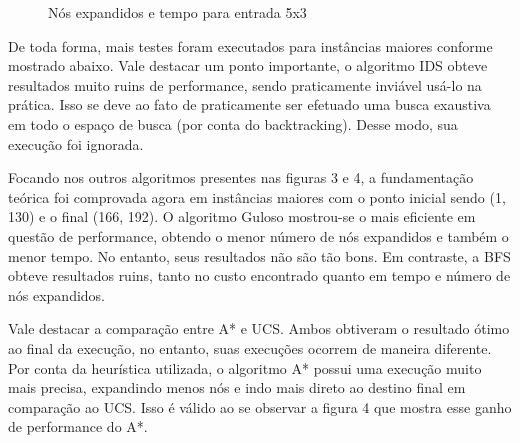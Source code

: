 \documentclass[10pt]{extarticle} %
\begin{document}
\begin{figure}[H]
\begin{minipage}{0.5\linewidth}
        \caption{Nós expandidos e tempo para entrada 5x3}
        \label{fig:expanded-nodes-vs-time}
    \end{minipage}
\end{figure}

De toda forma, mais testes foram executados para instâncias maiores conforme mostrado abaixo. Vale destacar um ponto importante, o algoritmo IDS obteve resultados muito ruins de performance, sendo praticamente inviável usá-lo na prática. Isso se deve ao fato de praticamente ser efetuado uma busca exaustiva em todo o espaço de busca (por conta do backtracking). Desse modo, sua execução foi ignorada.

Focando nos outros algoritmos presentes nas figuras 3 e 4, a fundamentação teórica foi comprovada agora em instâncias maiores com o ponto inicial sendo (1, 130) e o final (166, 192). O algoritmo Guloso mostrou-se o mais eficiente em questão de performance, obtendo o menor número de nós expandidos e também o menor tempo. No entanto, seus resultados não são tão bons. Em contraste, a BFS obteve resultados ruins, tanto no custo encontrado quanto em tempo e número de nós expandidos.

Vale destacar a comparação entre A* e UCS. Ambos obtiveram o resultado ótimo ao final da execução, no entanto, suas execuções ocorrem de maneira diferente. Por conta da heurística utilizada, o algoritmo A* possui uma execução muito mais precisa, expandindo menos nós e indo mais direto ao destino final em comparação ao UCS. Isso é válido ao se observar a figura 4 que mostra esse ganho de performance do A*.
\end{document}
